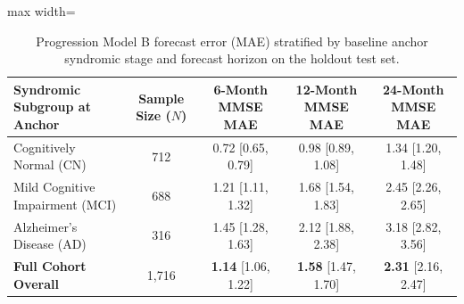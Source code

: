 \begin{table}[t]
\centering
\caption{Progression Model B forecast error (MAE) stratified by baseline anchor syndromic stage and forecast horizon on the holdout test set.}
\label{tab:forecast_by_stage}
\small
\begin{adjustbox}{max width=\linewidth}
\begin{tabular}{lcccc}
\toprule
\textbf{Syndromic Subgroup at Anchor} & \textbf{Sample Size ($N$)} & \textbf{6-Month MMSE MAE} & \textbf{12-Month MMSE MAE} & \textbf{24-Month MMSE MAE} \\
\midrule
Cognitively Normal (CN)               & 712                        & 0.72 [0.65, 0.79]         & 0.98 [0.89, 1.08]          & 1.34 [1.20, 1.48] \\
Mild Cognitive Impairment (MCI)       & 688                        & 1.21 [1.11, 1.32]         & 1.68 [1.54, 1.83]          & 2.45 [2.26, 2.65] \\
Alzheimer's Disease (AD)              & 316                        & 1.45 [1.28, 1.63]         & 2.12 [1.88, 2.38]          & 3.18 [2.82, 3.56] \\
\midrule
\textbf{Full Cohort Overall}          & 1,716                      & \textbf{1.14} [1.06, 1.22]& \textbf{1.58} [1.47, 1.70] & \textbf{2.31} [2.16, 2.47] \\
\bottomrule
\end{tabular}
\end{adjustbox}
\end{table}
